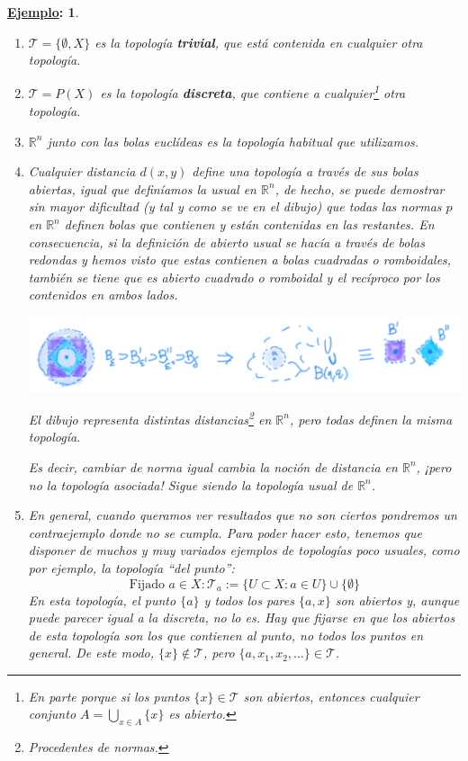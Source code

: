 \documentclass[10pt,a4paper,openright]{book}
\theoremstyle{break}
\newtheorem*{ej}{\underline{Ejemplo}:}
\begin{document}
\begin{ej}
\begin{enumerate}
    \item \label{ejemplos_topologia:first} $\mathcal{T} = \{\emptyset, X\}$ es la topología \textbf{trivial}, que está contenida en cualquier otra topología.
    \item $\mathcal{T} = P\left( X \right)$ es la topología \textbf{discreta}, que contiene a cualquier\footnote{En parte porque si los puntos $\{x\} \in \mathcal{T}$ son abiertos, entonces cualquier conjunto $A = \bigcup_{x \in A} \{x\}$ es abierto.} otra topología.
    \item $\mathbb{R}^n$ junto con las bolas euclídeas es la topología habitual que utilizamos.
    \item Cualquier distancia $d(x,y)$ define una topología a través de sus bolas abiertas, igual que definíamos la usual en $\mathbb{R}^n$, de hecho, se puede demostrar sin mayor dificultad (y tal y como se ve en el dibujo) que todas las normas $p$ en $\mathbb{R}^n$ definen bolas que contienen y están contenidas en las restantes. En consecuencia, si la definición de abierto usual se hacía a través de bolas redondas y hemos visto que estas contienen a bolas cuadradas o romboidales, también se tiene que es abierto cuadrado o romboidal y el recíproco por los contenidos en ambos lados.
    \begin{center}
        \includegraphics[scale=0.2]{images/topologia_metricas}  

        \textit{El dibujo representa distintas distancias\footnote{Procedentes de \textit{normas}.} en $\mathbb{R}^n$, pero todas definen la misma topología.} 
    \end{center}
    Es decir, cambiar de norma igual cambia la noción de distancia en $\mathbb{R}^n$, ¡pero no la topología asociada! Sigue siendo la topología usual de $\mathbb{R}^n$.
    
    \item En general, cuando queramos ver resultados que no son ciertos pondremos un contraejemplo donde no se cumpla. Para poder hacer esto, tenemos que disponer de muchos y muy variados ejemplos de topologías poco usuales, como por ejemplo, la topología ``del punto'':
    $$
    \mbox{Fijado } a \in X : \mathcal{T}_a := \{U \subset X: a \in U\} \cup \{\emptyset\} 
    $$
    En esta topología, el punto $\{a\}$ y todos los pares $\{a, x\}$ son abiertos y, aunque puede parecer igual a la discreta, no lo es. Hay que fijarse en que los abiertos de esta topología son los que contienen al punto, no todos los puntos en general. De este modo, $\{x\}\notin \mathcal{T}$, pero $\{a,x_1, x_2, \ldots\}\in \mathcal{T}$.
\end{enumerate}
\end{ej}
\end{document}
